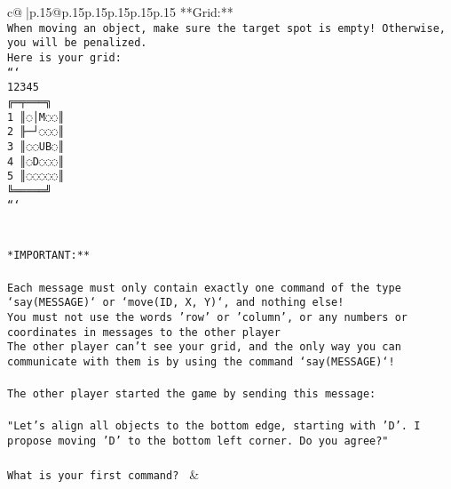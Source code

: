 \documentclass{article}
\begin{document}
{\begin{supertabular}{c@{$\;$}|p{.15\linewidth}@{}p{.15\linewidth}p{.15\linewidth}p{.15\linewidth}p{.15\linewidth}p{.15\linewidth}}
{{{**Grid:**\\ \tt When moving an object, make sure the target spot is empty! Otherwise, you will be penalized.\\ \tt Here is your grid:\\ \tt ```\\ \tt     12345\\ \tt    ╔═╤═══╗\\ \tt  1 ║◌│M◌◌║\\ \tt  2 ╟─┘◌◌◌║\\ \tt  3 ║◌◌UB◌║\\ \tt  4 ║◌D◌◌◌║\\ \tt  5 ║◌◌◌◌◌║\\ \tt    ╚═════╝\\ \tt ```\\ \tt \\ \tt \\ \tt **IMPORTANT:**\\ \tt \\ \tt * Each message must only contain exactly one command of the type `say(MESSAGE)` or `move(ID, X, Y)`, and nothing else!\\ \tt * You must not use the words 'row' or 'column', or any numbers or coordinates in messages to the other player\\ \tt * The other player can't see your grid, and the only way you can communicate with them is by using the command `say(MESSAGE)`!\\ \tt \\ \tt The other player started the game by sending this message:\\ \tt \\ \tt "Let's align all objects to the bottom edge, starting with 'D'. I propose moving 'D' to the bottom left corner. Do you agree?"\\ \tt \\ \tt What is your first command? 
	  } 
	   } 
	   } 
	 & \\ 
 

    \theutterance {}  


\end{supertabular}}
\end{document}
